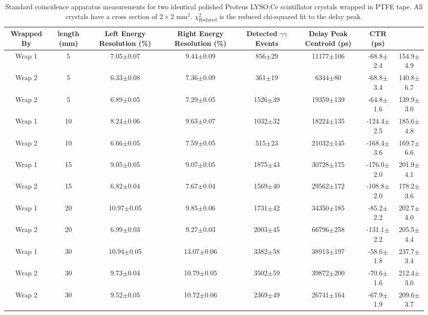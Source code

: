 \begin{table}
\caption{\label{tab:standardctr} Standard coincidence apparatus measurements for two identical polished Proteus LYSO:Ce scintillator crystals wrapped in PTFE tape. All crystals have a cross section of $2\times2$ mm$^2$. $\chi^2_\text{Reduced}$ is the reduced chi-squared fit to the delay peak.}
\begin{tabular}{cccccccc}
\hline
Wrapped By &  length (mm) & Left Energy Resolution (\%) & Right Energy Resolution (\%) & Detected $\gamma\gamma$ Events & Delay Peak Centroid (ps) & CTR (ps)\\
\hline
    Wrap 1 &      5 &   7.05$\pm$0.07 &   9.44$\pm$0.09 &   856$\pm$29 &  11177$\pm$106 &   -68.8$\pm$2.4 &  154.9$\pm$4.9 \\
    Wrap 2 &      5 &   6.33$\pm$0.08 &   7.36$\pm$0.09 &   361$\pm$19 &    6344$\pm$80 &   -68.8$\pm$3.4 &  140.8$\pm$6.7 \\
    Wrap 2 &      5 &   6.89$\pm$0.05 &   7.29$\pm$0.05 &  1526$\pm$39 &  19359$\pm$139 &   -64.8$\pm$1.6 &  139.9$\pm$3.0 \\
    Wrap 1 &     10 &   8.24$\pm$0.06 &   9.63$\pm$0.07 &  1032$\pm$32 &  18224$\pm$135 &  -124.4$\pm$2.5 &  185.6$\pm$4.8 \\
    Wrap 2 &     10 &   6.66$\pm$0.05 &   7.59$\pm$0.05 &   515$\pm$23 &  21032$\pm$145 &  -168.4$\pm$3.6 &  169.7$\pm$6.6 \\
    Wrap 1 &     15 &   9.05$\pm$0.05 &   9.07$\pm$0.05 &  1875$\pm$43 &  30728$\pm$175 &  -176.0$\pm$2.0 &  201.9$\pm$4.1 \\
    Wrap 2 &     15 &   6.82$\pm$0.04 &   7.67$\pm$0.04 &  1569$\pm$40 &  29562$\pm$172 &  -108.8$\pm$2.0 &  178.2$\pm$3.6 \\
    Wrap 1 &     20 &  10.97$\pm$0.05 &   9.85$\pm$0.06 &  1731$\pm$42 &  34350$\pm$185 &   -85.2$\pm$2.2 &  202.7$\pm$4.0 \\
    Wrap 2 &     20 &   6.99$\pm$0.03 &   9.27$\pm$0.03 &  2003$\pm$45 &  66796$\pm$258 &  -131.1$\pm$2.2 &  205.5$\pm$4.4 \\
    Wrap 1 &     30 &  10.94$\pm$0.05 &  13.07$\pm$0.06 &  3382$\pm$58 &  38913$\pm$197 &   -58.6$\pm$1.8 &  237.7$\pm$3.4 \\
    Wrap 2 &     30 &   9.73$\pm$0.04 &  10.79$\pm$0.05 &  3502$\pm$59 &  39872$\pm$200 &   -70.6$\pm$1.6 &  212.4$\pm$3.0 \\
    Wrap 2 &     30 &   9.52$\pm$0.05 &  10.72$\pm$0.06 &  2369$\pm$49 &  26741$\pm$164 &   -67.9$\pm$1.9 &  209.6$\pm$3.7 \\
\hline
\end{tabular}
\end{table}


